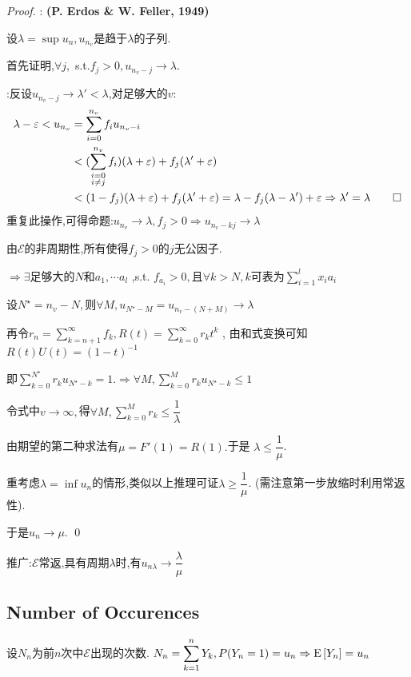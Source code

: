 \begin{proof}:
  \textbf{(P. Erdos \& W. Feller, 1949)}

  设$\lambda=\sup u_n,u_{n_v}$是趋于$ \lambda$的子列.

  首先证明,$ \forall j, $ s.t.$ f_j>0,u_{n_v-j}\to \lambda$.

  \proof:反设$ u_{n_v-j}\to \lambda'<\lambda$,对足够大的$ v$:
\begin{align*}
  \lambda-\varepsilon < u_{n_v} &=\sum_{i=0}^{n_v}f_iu_{n_v-i}\\
     &<(\sum_{\substack{i=0\\i\neq j}}^{n_v}f_i)(\lambda + \varepsilon) + f_j(\lambda' + \varepsilon)\\
     &<(1-f_j)(\lambda+\varepsilon) + f_j(\lambda' + \varepsilon)
     =\lambda-f_j(\lambda-\lambda') +\varepsilon \Rightarrow \lambda' = \lambda \qed
\end{align*}
重复此操作,可得命题:$u_{n_v}\to \lambda, f_j>0\Rightarrow  u_{n_v-kj}\to \lambda$

由$ \mathcal{E}$的非周期性,所有使得$ f_j>0$的$ j$无公因子.

$\Rightarrow  \exists 足够大的N 和 a_1,\cdots a_l$ ,s.t. $f_{a_i}>0,且 \forall k >N, k 可表为 \sum_{i=1}^l{x_ia_i} $

设$ N^\star = n_v-N,$则$ \forall M, u_{N^\star - M} = u_{n_v - (N+M)}\to \lambda$

再令$ r_n = \sum_{k=n+1}^\infty f_k, R(t) = \sum_{k=0}^{\infty}r_kt^k$ , 由和式变换可知$ R(t)U(t) = (1-t)^{-1}$

即$ \sum_{k=0}^{N^\star}{r_ku_{N^\star - k}} = 1.\Rightarrow  \forall M, \sum_{k=0}^M{r_ku_{N^\star - k}}\le 1$

令式中$v\to \infty , $得$\forall M, \sum_{k=0}^M{r_k} \le \dfrac{1}{\lambda} $

由期望的第二种求法有$ \mu = F'(1) = R(1). $于是 $\lambda \le \dfrac{1}{\mu}$.

重考虑$ \lambda=\inf u_n$的情形,类似以上推理可证$ \lambda \ge \dfrac{1}{\mu}$. (需注意第一步放缩时利用常返性).

于是$ u_n\to \mu$. \qed
\end{proof}

推广:$ \mathcal{E}$常返,具有周期$ \lambda$时,有$ u_{n\lambda}\to \dfrac{\lambda}{\mu}$

\subsection{Number of Occurences}
设$ N_n$为前$ n$次中$ \mathcal{E}$出现的次数. $ N_n = \sum_{k=1}^n{Y_k}, P(Y_n=1) = u_n\Rightarrow \E{Y_n} = u_n$

